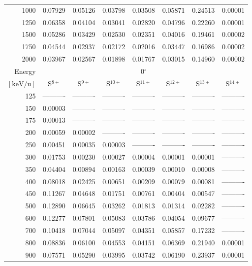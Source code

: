\begin{table}[ht]
\begin{tabular}{r|c|c|c|c|c|c|c}
     1000 & 0.07929 & 0.05126 & 0.03798 & 0.03508 & 0.05871 & 0.24513 & 0.00001 \\
     1250 & 0.06358 & 0.04104 & 0.03041 & 0.02820 & 0.04796 & 0.22260 & 0.00001 \\
     1500 & 0.05286 & 0.03429 & 0.02530 & 0.02351 & 0.04016 & 0.19461 & 0.00002 \\
     1750 & 0.04544 & 0.02937 & 0.02172 & 0.02016 & 0.03447 & 0.16986 & 0.00002 \\
     2000 & 0.03967 & 0.02567 & 0.01898 & 0.01767 & 0.03015 & 0.14960 & 0.00002 \\ \cline{1-8}
    Energy & \multicolumn{7}{c}{0$^\circ$} \\ \cline{2-8}
    $\mathrm{[keV/u]}$ & S$^{8+}$ & S$^{9+}$ & S$^{10+}$ & S$^{11+}$ & S$^{12+}$ & S$^{13+}$ & S$^{14+}$ \\ \cline{1-8}
      125 & ---------- & ---------- & ---------- & ---------- & ---------- & ---------- & ---------- \\
      150 & 0.00003 & ---------- & ---------- & ---------- & ---------- & ---------- & ---------- \\
      175 & 0.00013 & ---------- & ---------- & ---------- & ---------- & ---------- & ---------- \\
      200 & 0.00059 & 0.00002 & ---------- & ---------- & ---------- & ---------- & ---------- \\
      250 & 0.00451 & 0.00035 & 0.00003 & ---------- & ---------- & ---------- & ---------- \\
      300 & 0.01753 & 0.00230 & 0.00027 & 0.00004 & 0.00001 & 0.00001 & ---------- \\
      350 & 0.04404 & 0.00894 & 0.00163 & 0.00039 & 0.00010 & 0.00008 & ---------- \\
      400 & 0.08018 & 0.02425 & 0.00651 & 0.00209 & 0.00079 & 0.00081 & ---------- \\
      450 & 0.11267 & 0.04648 & 0.01751 & 0.00761 & 0.00404 & 0.00547 & ---------- \\
      500 & 0.12890 & 0.06645 & 0.03262 & 0.01813 & 0.01314 & 0.02282 & ---------- \\
      600 & 0.12277 & 0.07801 & 0.05083 & 0.03786 & 0.04054 & 0.09677 & ---------- \\
      700 & 0.10418 & 0.07044 & 0.05097 & 0.04351 & 0.05857 & 0.17232 & ---------- \\
      800 & 0.08836 & 0.06100 & 0.04553 & 0.04151 & 0.06369 & 0.21940 & 0.00001 \\
      900 & 0.07571 & 0.05290 & 0.03995 & 0.03742 & 0.06190 & 0.23937 & 0.00001 \\

\end{tabular}
\end{table}
